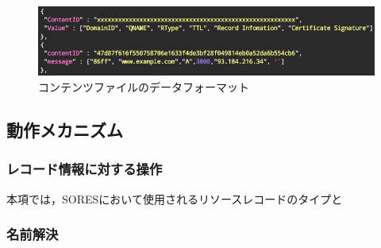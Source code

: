 \begin{figure}[h]
 \centering
 \includegraphics[scale=0.5]{figure/content-file.png}
 \caption{コンテンツファイルのデータフォーマット}
 \label{fig:manager-provider}
\end{figure}

\subsection{動作メカニズム}
\subsubsection{レコード情報に対する操作}
本項では，SORESにおいて使用されるリソースレコードのタイプと

\subsubsection{名前解決}
